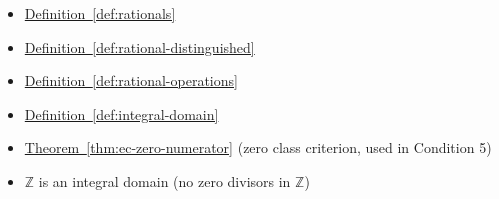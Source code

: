 \begin{dependencies}
\begin{itemize}
  \item \hyperref[def:rationals]{Definition~\ref*{def:rationals}}
  \item \hyperref[def:rational-distinguished]{Definition~\ref*{def:rational-distinguished}}
  \item \hyperref[def:rational-operations]{Definition~\ref*{def:rational-operations}}
  \item \hyperref[def:integral-domain]{Definition~\ref*{def:integral-domain}}
  \item \hyperref[thm:ec-zero-numerator]{Theorem~\ref*{thm:ec-zero-numerator}}
        \textnormal{(zero class criterion, used in Condition 5)}
  \item $\mathbb{Z}$ is an integral domain (no zero divisors in $\mathbb{Z}$)
\end{itemize}
\end{dependencies}

\clearpage
